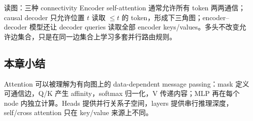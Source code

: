 
\begin{knowledgebox}{读图：三种 connectivity}
Encoder self-attention 通常允许所有 token 两两通信；causal decoder 只允许位置 $t$ 读取 $\le t$ 的 token，形成下三角图；encoder--decoder 模型还让 decoder queries 读取全部 encoder keys/values。多头不改变允许边集合，只是在同一边集合上学习多套并行路由规则。
\end{knowledgebox}


\subsection{本章小结}

Attention 可以被理解为有向图上的 data-dependent message passing：mask 定义可通信边，Q/K 产生 affinity，softmax 归一化，V 传递内容；MLP 再在每个 node 内独立计算。Heads 提供并行关系子空间，layers 提供串行推理深度，self/cross attention 只在 key/value 来源上不同。


